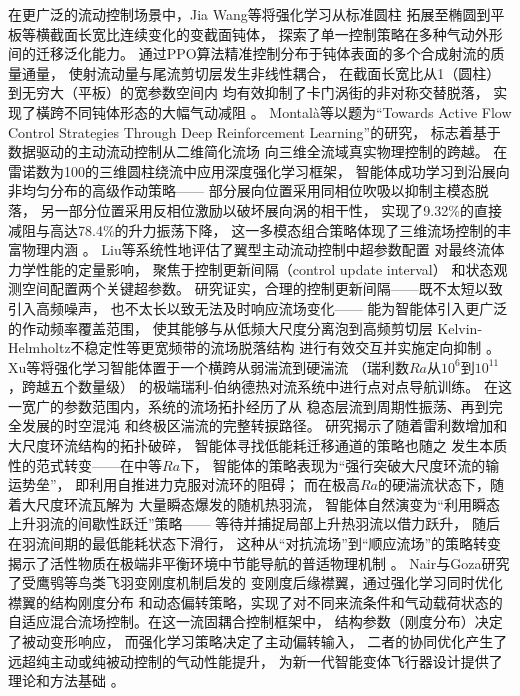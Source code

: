 在更广泛的流动控制场景中，Jia Wang等将强化学习从标准圆柱
拓展至椭圆到平板等横截面长宽比连续变化的变截面钝体，
探索了单一控制策略在多种气动外形间的迁移泛化能力。
通过PPO算法精准控制分布于钝体表面的多个合成射流的质量通量，
使射流动量与尾流剪切层发生非线性耦合，
在截面长宽比从1（圆柱）到无穷大（平板）的宽参数空间内
均有效抑制了卡门涡街的非对称交替脱落，
实现了橫跨不同钝体形态的大幅气动减阻
\cite{jiaWangDeepReinforcementLearning2024}。
Montalà等以题为“Towards Active Flow Control Strategies Through
Deep Reinforcement Learning”的研究，
标志着基于数据驱动的主动流动控制从二维简化流场
向三维全流域真实物理控制的跨越。
在雷诺数为100的三维圆柱绕流中应用深度强化学习框架，
智能体成功学习到沿展向非均匀分布的高级作动策略——
部分展向位置采用同相位吹吸以抑制主模态脱落，
另一部分位置采用反相位激励以破坏展向涡的相干性，
实现了9.32\%的直接减阻与高达78.4\%的升力振荡下降，
这一多模态组合策略体现了三维流场控制的丰富物理内涵
\cite{montalaTowardsActiveFlowControl2024}。
Liu等系统性地评估了翼型主动流动控制中超参数配置
对最终流体力学性能的定量影响，
聚焦于控制更新间隔（control update interval）
和状态观测空间配置两个关键超参数。
研究证实，合理的控制更新间隔——既不太短以致引入高频噪声，
也不太长以致无法及时响应流场变化——
能为智能体引入更广泛的作动频率覆盖范围，
使其能够与从低频大尺度分离泡到高频剪切层
Kelvin-Helmholtz不稳定性等更宽频带的流场脱落结构
进行有效交互并实施定向抑制
\cite{liuReinforcementLearningClosedLoop2025}。
Xu等将强化学习智能体置于一个横跨从弱湍流到硬湍流
（瑞利数$Ra$从$10^6$到$10^{11}$，跨越五个数量级）
的极端瑞利-伯纳德热对流系统中进行点对点导航训练。
在这一宽广的参数范围内，系统的流场拓扑经历了从
稳态层流到周期性振荡、再到完全发展的时空混沌
和终极区湍流的完整转捩路径。
研究揭示了随着雷利数增加和大尺度环流结构的拓扑破碎，
智能体寻找低能耗迁移通道的策略也随之
发生本质性的范式转变——在中等$Ra$下，
智能体的策略表现为“强行突破大尺度环流的输运势垒”，
即利用自推进力克服对流环的阻碍；
而在极高$Ra$的硬湍流状态下，随着大尺度环流瓦解为
大量瞬态爆发的随机热羽流，
智能体自然演变为“利用瞬态上升羽流的间歇性跃迁”策略——
等待并捕捉局部上升热羽流以借力跃升，
随后在羽流间期的最低能耗状态下滑行，
这种从“对抗流场”到“顺应流场”的策略转变
揭示了活性物质在极端非平衡环境中节能导航的普适物理机制
\cite{xuLearningTraverseConvective2026}。
Nair与Goza研究了受鹰鸮等鸟类飞羽变刚度机制启发的
变刚度后缘襟翼，通过强化学习同时优化襟翼的结构刚度分布
和动态偏转策略，实现了对不同来流条件和气动载荷状态的
自适应混合流场控制。在这一流固耦合控制框架中，
结构参数（刚度分布）决定了被动变形响应，
而强化学习策略决定了主动偏转输入，
二者的协同优化产生了远超纯主动或纯被动控制的气动性能提升，
为新一代智能变体飞行器设计提供了理论和方法基础
\cite{nairBioinspiredVariablestiffnessFlaps2023}。

